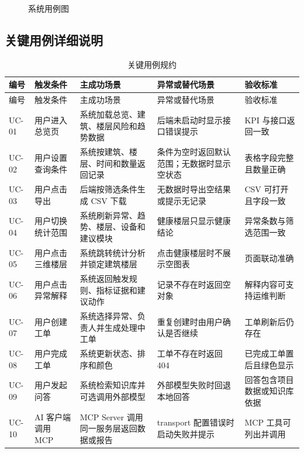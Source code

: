 \documentclass[12pt,a4paper]{ctexart}
\begin{document}
\begin{figure}[H]
{
}
\caption{系统用例图}
\end{figure}

\subsection{关键用例详细说明}
\begin{longtable}{L{1.5cm}L{2.6cm}L{3.4cm}L{3.4cm}L{3.2cm}}
\caption{关键用例规约}\\
\toprule
编号 & 触发条件 & 主成功场景 & 异常或替代场景 & 验收标准 \\
\midrule
\endfirsthead
\toprule
编号 & 触发条件 & 主成功场景 & 异常或替代场景 & 验收标准 \\
\midrule
\endhead
UC-01 & 用户进入总览页 & 系统加载总览、建筑、楼层风险和趋势数据 & 后端未启动时显示接口错误提示 & KPI 与接口返回一致 \\
UC-02 & 用户设置查询条件 & 系统按建筑、楼层、时间和数量返回记录 & 条件为空时返回默认范围；无数据时显示空状态 & 表格字段完整且数量正确 \\
UC-03 & 用户点击导出 & 后端按筛选条件生成 CSV 下载 & 无数据时导出空结果或提示无记录 & CSV 可打开且字段一致 \\
UC-04 & 用户切换统计范围 & 系统刷新异常、趋势、楼层、设备和建议模块 & 健康楼层只显示健康结论 & 异常条数与筛选范围一致 \\
UC-05 & 用户点击三维楼层 & 系统跳转统计分析并锁定建筑楼层 & 点击健康楼层时不展示空图表 & 页面联动准确 \\
UC-06 & 用户点击异常解释 & 系统返回触发规则、指标证据和建议动作 & 记录不存在时返回空对象 & 解释内容可支持运维判断 \\
UC-07 & 用户创建工单 & 系统选择异常、负责人并生成处理中工单 & 重复创建时由用户确认是否继续 & 工单刷新后仍存在 \\
UC-08 & 用户完成工单 & 系统更新状态、排序和颜色 & 工单不存在时返回 404 & 已完成工单置后且绿色显示 \\
UC-09 & 用户发起问答 & 系统检索知识库并可选调用外部模型 & 外部模型失败时回退本地回答 & 回答包含项目数据或知识库依据 \\
UC-10 & AI 客户端调用 MCP & MCP Server 调用同一服务层返回数据或报告 & transport 配置错误时启动失败并提示 & MCP 工具可列出并调用 \\
\bottomrule
\end{longtable}
\end{document}
